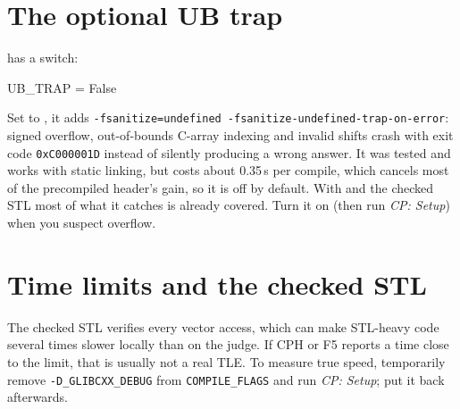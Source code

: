 \section{The optional UB trap}\label{sec:ubtrap}

 has a switch:

\begin{code}
UB_TRAP = False
\end{code}

Set to , it adds \texttt{-fsanitize=undefined -fsanitize-undefined-trap-on-error}: signed overflow,
out-of-bounds C-array indexing and invalid shifts crash with exit code \texttt{0xC000001D} instead of silently
producing a wrong answer. It was tested and works with static linking, but costs about 0.35\,s per compile, which
cancels most of the precompiled header's gain, so it is off by default. With  and the
checked STL most of what it catches is already covered. Turn it on (then run \emph{CP: Setup}) when you suspect
overflow.

\section{Time limits and the checked STL}

The checked STL verifies every vector access, which can make STL-heavy code several times slower locally than on
the judge. If CPH or F5 reports a time close to the limit, that is usually not a real TLE. To measure true speed,
temporarily remove \texttt{-D\_GLIBCXX\_DEBUG} from \texttt{COMPILE\_FLAGS} and run \emph{CP: Setup}; put it back afterwards.
